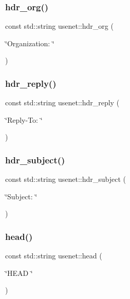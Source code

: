 \hypertarget{namespaceusenet_ae6f7fa93e8a59231c96161a68fd9bb84}{}\label{namespaceusenet_ae6f7fa93e8a59231c96161a68fd9bb84} 
\subsubsection{\texorpdfstring{hdr\+\_\+org()}{hdr\_org()}}
{\footnotesize\ttfamily const std\+::string usenet\+::hdr\+\_\+org (\begin{DoxyParamCaption}\item[{\char`\"{}Organization\+: \char`\"{}}]{ }\end{DoxyParamCaption})}

\hypertarget{namespaceusenet_a1e3efa9640d1a83e9bb71408528eb248}{}\label{namespaceusenet_a1e3efa9640d1a83e9bb71408528eb248} 
\subsubsection{\texorpdfstring{hdr\+\_\+reply()}{hdr\_reply()}}
{\footnotesize\ttfamily const std\+::string usenet\+::hdr\+\_\+reply (\begin{DoxyParamCaption}\item[{\char`\"{}Reply-\/To\+: \char`\"{}}]{ }\end{DoxyParamCaption})}

\hypertarget{namespaceusenet_a66133a22c8206f97b765ec5195c007fd}{}\label{namespaceusenet_a66133a22c8206f97b765ec5195c007fd} 
\subsubsection{\texorpdfstring{hdr\+\_\+subject()}{hdr\_subject()}}
{\footnotesize\ttfamily const std\+::string usenet\+::hdr\+\_\+subject (\begin{DoxyParamCaption}\item[{\char`\"{}Subject\+: \char`\"{}}]{ }\end{DoxyParamCaption})}

\hypertarget{namespaceusenet_ac716943545af558fdf3da5098c8dc7e6}{}\label{namespaceusenet_ac716943545af558fdf3da5098c8dc7e6} 
\subsubsection{\texorpdfstring{head()}{head()}}
{\footnotesize\ttfamily const std\+::string usenet\+::head (\begin{DoxyParamCaption}\item[{\char`\"{}H\+E\+AD \char`\"{}}]{ }\end{DoxyParamCaption})}

